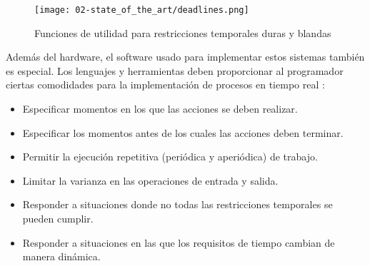 \begin{figure}
  \centering
  \texttt{[image: 02-state\_of\_the\_art/deadlines.png]}
  \caption{Funciones de utilidad para restricciones temporales duras y blandas}
  \label{fig:02-deadlines}
\end{figure}

Además del hardware, el software usado para implementar estos sistemas también
es especial. Los lenguajes y herramientas deben proporcionar al programador
ciertas comodidades para la implementación de procesos en tiempo real
\cite{burns_real-time_2009}:

\begin{itemize}
  \item Especificar momentos en los que las acciones se deben realizar.
  \item Especificar los momentos antes de los cuales las acciones deben terminar.
  \item Permitir la ejecución repetitiva (periódica y aperiódica) de trabajo.
  \item Limitar la varianza en las operaciones de entrada y salida.
  \item Responder a situaciones donde no todas las restricciones temporales se
        pueden cumplir.
  \item Responder a situaciones en las que los requisitos de tiempo cambian de
        manera dinámica.
\end{itemize}


